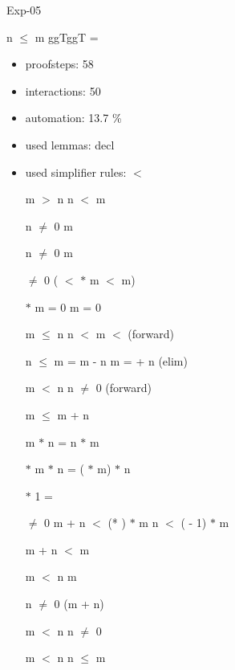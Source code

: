 \documentclass[a4paper]{article}
\begin{document}
\raggedright
              



\begin{minipage}{\textwidth}
\begin{center}

\end{center}
\end{minipage}

\vspace{5ex}

{\Huge Exp-05}

\vspace{5ex}

 \Fol n $\le$ m \Imp \Do ggT\Dc \Do ggT\Dc {} = 

\begin{itemize}
\item proofsteps: 58
\item interactions: 50
\item automation: 13.7 \%
\item used lemmas: decl 
\item used simplifier rules:
$<$

 \Fol m $>$ n \Equiv n $<$ m

n $\neq$ 0 \Fol m %

n $\neq$ 0 \Fol m %

 \Fol {} $\neq$ 0 \Imp ( $<$  $*$ m  $<$ m)

  $*$ m = 0 \Equiv m = 0

 \Fol m $\le$ n \And n $<$  \Imp m $<$  (forward)

n $\le$ m \Fol {} = m - n \Equiv m =  + n (elim)

 \Fol m $<$ n \Imp n $\neq$ 0 (forward)

 \Fol m $\le$ m + n

 \Fol m $*$ n = n $*$ m

 \Fol {} $*$ m $*$ n = ( $*$ m) $*$ n

 \Fol {} $*$ 1 = 

 $\neq$ 0 \Fol m + n $<$ (* ) $*$ m \Equiv n $<$ ( - 1) $*$ m

 \Fol \Not m + n $<$ m

 \Fol m $<$ n \Imp m %

n $\neq$ 0 \Fol (m + n) %

 \Fol m $<$ n \Imp n $\neq$ 0

 \Fol \Not m $<$ n \Equiv n $\le$ m


\end{itemize}
\end{document}
